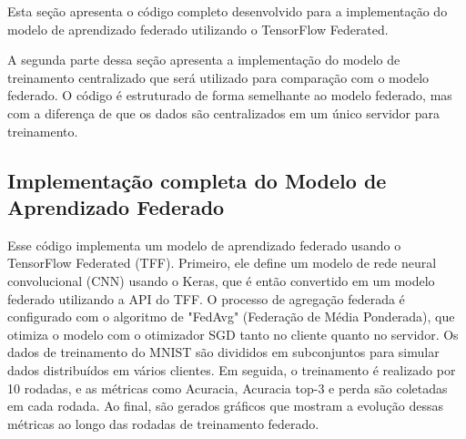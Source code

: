 Esta seção apresenta o código completo desenvolvido para a implementação do modelo de aprendizado federado utilizando o TensorFlow Federated.

A segunda parte dessa seção apresenta a implementação do modelo de treinamento centralizado que será utilizado para comparação com o modelo federado. O código é estruturado de forma semelhante ao modelo federado, mas com a diferença de que os dados são centralizados em um único servidor para treinamento.

\subsection{Implementação completa do Modelo de Aprendizado Federado}

Esse código implementa um modelo de aprendizado federado usando o TensorFlow Federated (TFF). Primeiro, ele define um modelo de rede neural convolucional (CNN) usando o Keras, que é então convertido em um modelo federado utilizando a API do TFF. O processo de agregação federada é configurado com o algoritmo de "FedAvg" (Federação de Média Ponderada), que otimiza o modelo com o otimizador SGD tanto no cliente quanto no servidor. Os dados de treinamento do MNIST são divididos em subconjuntos para simular dados distribuídos em vários clientes. Em seguida, o treinamento é realizado por 10 rodadas, e as métricas como Acuracia, Acuracia top-3 e perda são coletadas em cada rodada. Ao final, são gerados gráficos que mostram a evolução dessas métricas ao longo das rodadas de treinamento federado.

